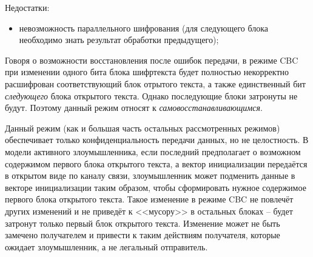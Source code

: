 Недостатки:
\begin{itemize}
	\item невозможность параллельного шифрования (для следующего блока необходимо знать результат обработки предыдущего);
\end{itemize}

Говоря о возможности восстановления после ошибок передачи, в режиме CBC при изменении одного бита блока шифртекста будет полностью некорректно расшифрован соответствующий блок отрытого текста, а также единственный бит \emph{следующего} блока открытого текста. Однако последующие блоки затронуты не будут. Поэтому данный режим относят к \emph{самовосстанавливающимся}.

Данный режим (как и большая часть остальных рассмотренных режимов) обеспечивает только конфиденциальность передачи данных, но не целостность. В модели активного злоумышленника, если последний предполагает о возможном содержимом первого блока открытого текста, а вектор инициализации передаётся в открытом виде по каналу связи, злоумышленник может подменить данные в векторе инициализации таким образом, чтобы сформировать нужное содержимое первого блока открытого текста. Такое изменение в режиме CBC не повлечёт других изменений и не приведёт к <<мусору>> в остальных блоках -- будет затронут только первый блок открытого текста. Изменение может не быть замечено получателем и привести к таким действиям получателя, которые ожидает злоумышленник, а не легальный отправитель.